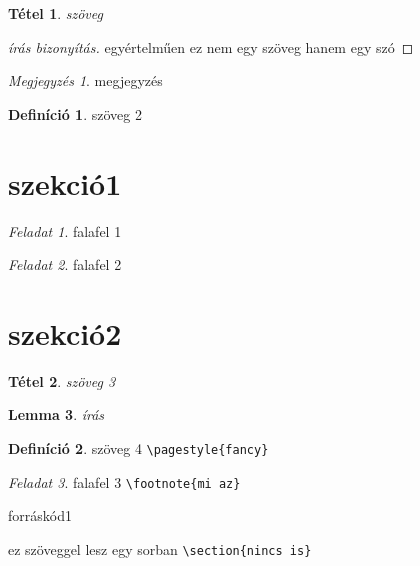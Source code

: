 \documentclass{article}
\theoremstyle{plain}
\newtheorem{tet}{Tétel}
\theoremstyle{definition}
\newtheorem{defin}{Definíció}
\theoremstyle{plain}
\newtheorem{lem}[tet]{Lemma}
\theoremstyle{remark}
\newtheorem{fela}{Feladat}[section]
\newtheorem*{megj}{Megjegyzés}
\begin{document}
\lstlistoflistings
{}
\vspace{2cm}

\begin{tet}
szöveg
\end{tet}
\begin{proof}[írás bizonyítás]
egyértelműen ez nem egy szöveg hanem egy szó
\end{proof}

\begin{megj}
megjegyzés
\end{megj}

\begin{defin}
szöveg 2
\end{defin}

\section{szekció1}

\begin{fela}
falafel 1
\end{fela}

\begin{fela}
falafel 2
\end{fela}

\section{szekció2}

\begin{tet}
szöveg 3
\end{tet}

\begin{lem}
írás
\end{lem}

\begin{defin}
szöveg  4 \verb|\pagestyle{fancy}|
\end{defin}

\begin{fela}
falafel 3 \verb|\footnote{mi az}|
\end{fela}

\begin{forráskód} \caption{forráskód1}

ez szöveggel lesz egy sorban  \verb|\section{nincs is}|
\end{forráskód}
\end{document}
